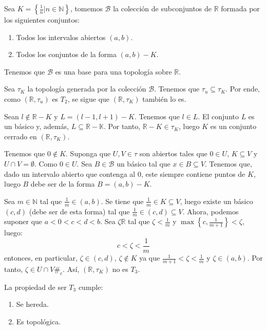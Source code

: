 \documentclass[12pt]{report}
\theoremstyle{largebreak}
\newcommand\contradiction{\ensuremath{\#_c}}
\begin{document}
    \begin{exa}
        Sea $K=\left\{\frac{1}{n}\Big|n\in\mathbb{N}\right\}$, tomemos $\mathcal{B}$ la colección de subconjuntos de $\mathbb{R}$ formada por los siguientes conjuntos:
        \begin{enumerate}
            \item Todos los intervalos abiertos $(a,b)$.
            \item Todos los conjuntos de la forma $(a,b)-K$.
        \end{enumerate}
        Tenemos que $\mathcal{B}$ es una base para una topología sobre $\mathbb{R}$.

        Sea $\tau_K$ la topología generada por la colección $\mathcal{B}$. Tenemos que $\tau_u\subseteq \tau_K$. Por ende, como $(\mathbb{R},\tau_u)$ es $T_2$, se sigue que $(\mathbb{R},\tau_K)$ también lo es.

        Sean $l\notin\mathbb{R}-K$ y $L=(l-1,l+1)-K$. Tenemos que $l\in L$. El conjunto $L$ es un básico y, además, $L\subseteq\mathbb{R}-\mathbb{K}$. Por tanto, $\mathbb{R}-K\in\tau_K$, luego $K$ es un conjunto cerrado en $(\mathbb{R},\tau_K)$.

        Tenemos que $0\notin K$. Suponga que $U,V\in\tau$ son abiertos tales que $0\in U$, $K\subseteq V$ y $U\cap V=\emptyset$. Como $0\in U$. Sea $B\in\mathcal{B}$ un básico tal que $x\in B\subseteq V$. Tenemos que, dado un intervalo abierto que contenga al $0$, este siempre contiene puntos de $K$, luego $B$ debe ser de la forma $B=(a,b)-K$.

        Sea $m\in\mathbb{N}$ tal que $\frac{1}{m}\in(a,b)$. Se tiene que $\frac{1}{m}\in K\subseteq V$, luego existe un básico $(c,d)$ (debe ser de esta forma) tal que $\frac{1}{m}\in(c,d)\subseteq V$. Ahora, podemos suponer que $a<0<c<d<b$.
        Sea $\zeta\mathbb{R}$ tal que $\zeta<\frac{1}{m}$ y $\max\left\{c,\frac{1}{m+1} \right\}<\zeta$, luego:
        \begin{equation*}
            c<\zeta<\frac{1}{m}
        \end{equation*}
        entonces, en particular, $\zeta\in(c,d)$, $\zeta\notin K$ ya que $\frac{1}{m+1}<\zeta<\frac{1}{m}$ y $\zeta\in(a,b)$. Por tanto, $\zeta\in U\cap V$\contradiction. Así, $(\mathbb{R},\tau_K)$ no es $T_3$.
    \end{exa}

    \begin{propo}
        La propiedad de ser $T_3$ cumple:
        \begin{enumerate}
            \item Se hereda.
            \item Es topológica.
        \end{enumerate}
    \end{propo}
\end{document}
